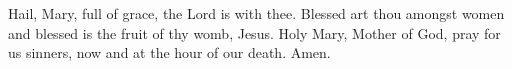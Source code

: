 \begin{otherlanguage}{english}
Hail, Mary, full of grace,
the Lord is with thee.
Blessed art thou amongst women
and blessed is the fruit of thy womb, Jesus.
Holy Mary, Mother of God,
pray for us sinners,
now and at the hour of our death. 
Amen.
\end{otherlanguage}